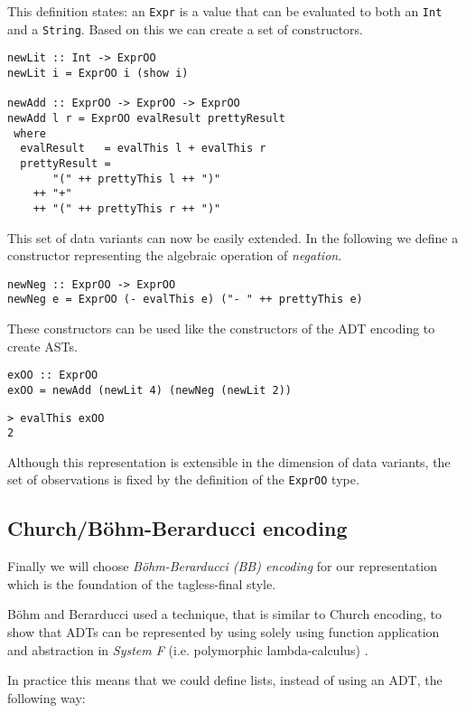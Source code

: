 This definition states: an \texttt{Expr} is a value that can be evaluated to
both an \texttt{Int} and a \texttt{String}. Based on this we can create a set of
constructors.

\begin{lstlisting}
newLit :: Int -> ExprOO
newLit i = ExprOO i (show i)

newAdd :: ExprOO -> ExprOO -> ExprOO
newAdd l r = ExprOO evalResult prettyResult
 where
  evalResult   = evalThis l + evalThis r
  prettyResult =
       "(" ++ prettyThis l ++ ")"
    ++ "+"
    ++ "(" ++ prettyThis r ++ ")"
\end{lstlisting}

This set of data variants can now be easily extended. In the following we define
a constructor representing the algebraic operation of \emph{negation}.

\begin{lstlisting}
newNeg :: ExprOO -> ExprOO
newNeg e = ExprOO (- evalThis e) ("- " ++ prettyThis e)
\end{lstlisting}

These constructors can be used like the constructors of the ADT encoding to
create ASTs.

\begin{lstlisting}
exOO :: ExprOO
exOO = newAdd (newLit 4) (newNeg (newLit 2))
\end{lstlisting}
\begin{lstlisting}
> evalThis exOO
2
\end{lstlisting}

Although this representation is extensible in the dimension of data variants,
the set of observations is fixed by the definition of the \texttt{ExprOO} type.

\subsection{Church/Böhm-Berarducci encoding}
\label{subsection_BB_encoding}

Finally we will choose \emph{Böhm-Berarducci (BB) encoding} for our
representation which is the foundation of the tagless-final style.

Böhm and Berarducci used a technique, that is similar to Church encoding, to
show that ADTs can be represented by using solely using function application and
abstraction in \emph{System F} (i.e. polymorphic lambda-calculus)
\cite{boehm_berarducci}.

In practice this means that we could define lists, instead of using an ADT, the
following way:

